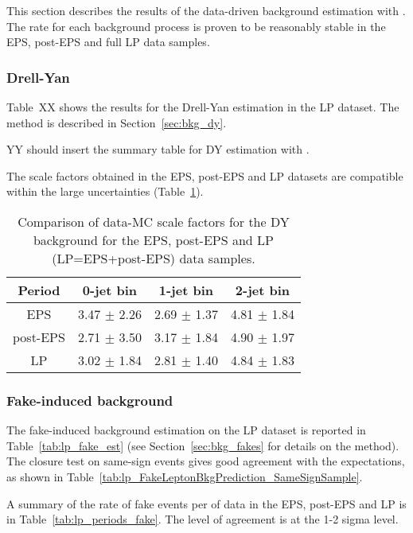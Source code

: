 This section describes the results of the data-driven background estimation with \lpintlumi. 
The rate for each background process is proven to be reasonably stable in the EPS, post-EPS and full LP data samples.

\subsubsection{Drell-Yan}

Table~XX shows the results for the Drell-Yan estimation in the LP dataset. 
The method is described in Section~\ref{sec:bkg_dy}.

YY should insert the summary table for DY estimation with \lpintlumi.

The scale factors obtained in the EPS, post-EPS and LP datasets are compatible within the large uncertainties (Table~\ref{tab:lp_periods_dy}).

\begin{table}[!htbp]
\begin{center}
\begin{tabular}{c c c c} 
\hline
Period & 0-jet bin & 1-jet bin & 2-jet bin \\ 
\hline
EPS      & 3.47 $\pm$ 2.26 & 2.69 $\pm$ 1.37 & 4.81 $\pm$ 1.84 \\
post-EPS & 2.71 $\pm$ 3.50 & 3.17 $\pm$ 1.84 & 4.90 $\pm$ 1.97 \\
LP       & 3.02 $\pm$ 1.84 & 2.81 $\pm$ 1.40 & 4.84 $\pm$ 1.83 \\
\hline
\end{tabular}
\caption{Comparison of data-MC scale factors for the DY background for the EPS, post-EPS and LP (LP=EPS+post-EPS) data samples.}
\label{tab:lp_periods_dy}
\end{center}
\end{table}


\subsubsection{Fake-induced background}

The fake-induced background estimation on the LP dataset is reported in Table~\ref{tab:lp_fake_est} 
(see Section~\ref{sec:bkg_fakes} for details on the method).
The closure test on same-sign events gives good agreement with the expectations, as shown in Table~\ref{tab:lp_FakeLeptonBkgPrediction_SameSignSample}.

A summary of the rate of fake events per \ifb of data in the EPS, post-EPS and LP is in Table~\ref{tab:lp_periods_fake}. 
The level of agreement is at the 1-2 sigma level.

